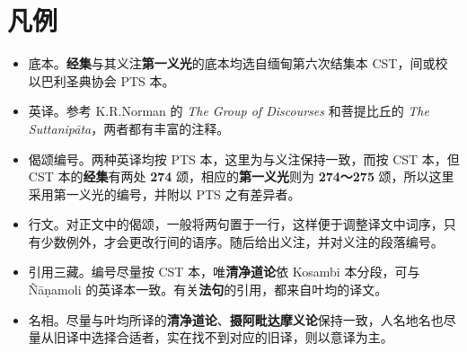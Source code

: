 \chapter{凡例}

\begin{itemize}
    \item 底本。\textbf{经集}与其义注\textbf{第一义光}的底本均选自缅甸第六次结集本 CST，间或校以巴利圣典协会 PTS 本。
    \item 英译。参考 K.R.Norman 的 \textit{The Group of Discourses} 和菩提比丘的 \textit{The Suttanipāta}，两者都有丰富的注释。
    \item 偈颂编号。两种英译均按 PTS 本，这里为与义注保持一致，而按 CST 本，但 CST 本的\textbf{经集}有两处 \textbf{274} 颂，相应的\textbf{第一义光}则为 \textbf{274～275} 颂，所以这里采用第一义光的编号，并附以 PTS 之有差异者。
    \item 行文。对正文中的偈颂，一般将两句置于一行，这样便于调整译文中词序，只有少数例外，才会更改行间的语序。随后给出义注，并对义注的段落编号。
    \item 引用三藏。编号尽量按 CST 本，唯\textbf{清净道论}依 Kosambi 本分段，可与 Ñāṇamoli 的英译本一致。有关\textbf{法句}的引用，都来自叶均的译文。
    \item 名相。尽量与叶均所译的\textbf{清净道论}、\textbf{摄阿毗达摩义论}保持一致，人名地名也尽量从旧译中选择合适者，实在找不到对应的旧译，则以意译为主。
\end{itemize}